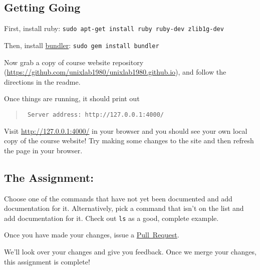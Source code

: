 \documentclass{article}
\begin{document}
\subsection*{Getting Going}

First, install ruby: \texttt{sudo apt-get install ruby ruby-dev zlib1g-dev}

Then, install \href{http://bundler.io}{bundler}: \texttt{sudo gem install bundler}

Now grab a copy of course website repository
(\url{https://github.com/unixlab1980/unixlab1980.github.io}), and follow the directions
in the readme.

Once things are running, it should print out
\begin{quote}\tt
  Server address: http://127.0.0.1:4000/
\end{quote}

Visit \url{http://127.0.0.1:4000/} in your browser and you should see your own
local copy of the course website! Try making some changes to the site and then
refresh the page in your browser.

\subsection*{The Assignment:}

Choose one of the commands that have not yet been documented and add
documentation for it. Alternatively, pick a command that isn't on the
list and add documentation for it.
Check out \texttt{ls} as a good, complete example.

Once you have made your changes, issue a
\href{https://guides.github.com/activities/contributing-to-open-source/#contributing}{Pull~Request}.

We'll look over your changes and give you feedback. Once we merge your
changes, this assignment is complete!
\end{document}
